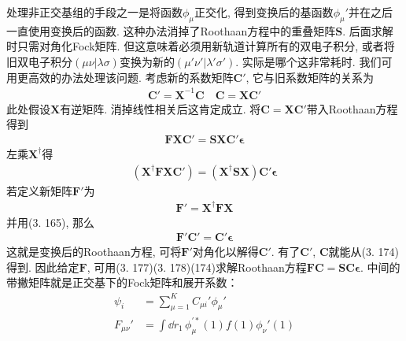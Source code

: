 处理非正交基组的手段之一是将函数${\phi_\mu}$正交化, 
得到变换后的基函数$\phi_\mu'$并在之后一直使用变换后的函数. 
这种办法消掉了Roothaan方程中的重叠矩阵$\mathbf{S}$. 
后面求解时只需对角化Fock矩阵. 
但这意味着必须用新轨道计算所有的双电子积分, 
或者将旧双电子积分$(\mu\nu|\lambda\sigma)$变换为新的$(\mu'\nu'|\lambda'\sigma')$. 
实际是哪个这非常耗时. 
我们可用更高效的办法处理该问题. 
考虑新的系数矩阵$\mathbf{C}'$, 
它与旧系数矩阵的关系为
\begin{align}
	\mathbf{C'=X}^{-1}\mathbf{C}\quad \mathbf{C=XC'}
\end{align}
此处假设$\mathbf{X}$有逆矩阵. 
消掉线性相关后这肯定成立. 
将$\mathbf{C=XC'}$带入Roothaan方程得到
\begin{align}
	\mathbf{FXC'=SXC'}\bm{\epsilon}
\end{align} 
左乘$\mathbf{X^\dagger}$得
\begin{align}
	(\mathbf{X^\dagger FX}\mathbf{C'}) = (\mathbf{X^\dagger SX})\mathbf{C'}\bm{\epsilon}
\end{align}
若定义新矩阵$\mathbf{F}'$为
\begin{align}
	\mathbf{F'=X^\dagger FX}
\end{align}
并用(3.
165), 
那么
\begin{align}
	\mathbf{F'C'=C'}\bm{\epsilon}
\end{align}
这就是变换后的Roothaan方程, 
可将$\mathbf{F'}$对角化以解得$\mathbf{C'}$. 
有了$\mathbf{C'}$, 
$\mathbf{C}$就能从(3.
174)得到. 
因此给定$\mathbf{F}$, 
可用(3.
177)(3.
178)(174)求解Roothaan方程$\mathbf{FC=SC}\bm{\epsilon}$. 
中间的带撇矩阵就是正交基下的Fock矩阵和展开系数：
\begin{align}
	\psi_i & = \sum_{\mu=1}^{K}C_{\mu i}'\phi_\mu'\\
	F_{\mu\nu}' & = \int\dd{r}_1\,\phi^{\prime*}_\mu(1)f(1)\phi_\nu'(1)
\end{align}
